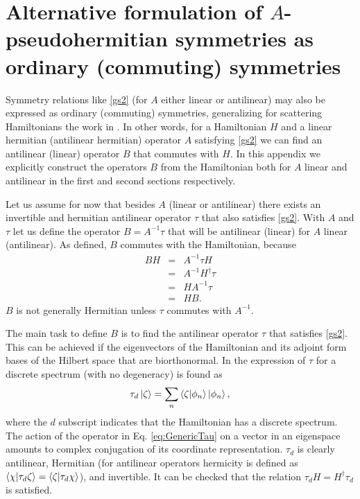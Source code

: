 \section{Alternative formulation of $A$-pseudohermitian symmetries as ordinary (commuting) symmetries}
\label{app5}
%
%
%
Symmetry relations like \eqref{gs2} (for $A$ either linear or antilinear) may also be expressed as ordinary (commuting) symmetries, generalizing for scattering Hamiltonians the work in \cite{Mostafazadeh2002,Mostafazadeh2002a,Mostafazadeh2002b}. In other words, for a Hamiltonian $H$ and a linear hermitian (antilinear hermitian) operator $A$ satisfying \eqref{gs2} we can find an antilinear (linear) operator $B$ that commutes with $H$. In this appendix we explicitly construct the operators $B$ from the Hamiltonian both for $A$ linear and antilinear in the first and second sections respectively.

Let us assume for now that besides $A$ (linear or antilinear) there exists an invertible and hermitian antilinear operator $\tau$ that also satisfies \eqref{gs2}. With $A$ and $\tau$ let us define the operator $B = A^{-1} \tau$ that will be antilinear (linear) for $A$ linear (antilinear). As defined, $B$ commutes with the Hamiltonian, because
%
\begin{eqnarray}
    B H &=& A^{-1}\tau H \nonumber \\
           &=& A^{-1} H^\dagger \tau \nonumber \\
           &=& H A^{-1} \tau\nonumber \\
           &=& H B.
    \label{eq:HiddenSymmetry}
\end{eqnarray}
%
$B$ is not generally Hermitian unless $\tau$ commutes with $A^{-1}$.

The main task  to define  $B$ is to find the antilinear operator $\tau$ that satisfies \eqref{gs2}.
This can be achieved if the eigenvectors of the Hamiltonian and its adjoint form bases of the Hilbert space that are biorthonormal.
In \cite{Mostafazadeh2002b} the expression of $\tau$ for a discrete spectrum (with no degeneracy) is found as
%
\begin{equation}
    \tau_d \ket{\zeta} = \sum_n \braket{\zeta}{\phi_n} \ket{\phi_n},
    \label{eq:GenericTau}
\end{equation}
%
where the $d$ subscript indicates that the Hamiltonian has a discrete spectrum. The action of the operator in Eq. \eqref{eq:GenericTau} on a vector in an eigenspace amounts to complex conjugation of its coordinate
representation. $\tau_d$ is clearly antilinear, Hermitian (for antilinear operators hermicity is defined as $\braket{\chi}{\tau_d \zeta} = \braket{\zeta}{\tau_d \chi}$), and invertible. It can be checked that the relation $\tau_d H = H^\dagger \tau_d$ is satisfied.

